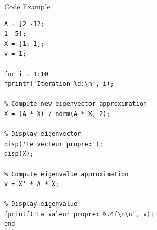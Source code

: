 \documentclass[french, 10pt]{beamer}
\theoremstyle{definition}
\begin{document}
\begin{frame}[fragile]{Code Example}
		\begin{lstlisting}
A = [2 -12;
1 -5];
X = [1; 1];
v = 1;

for i = 1:10
fprintf('Iteration %d:\n', i);

% Compute new eigenvector approximation
X = (A * X) / norm(A * X, 2);

% Display eigenvector
disp('Le vecteur propre:');
disp(X);

% Compute eigenvalue approximation
v = X' * A * X;

% Display eigenvalue
fprintf('La valeur propre: %.4f\n\n', v);
end

	
\end{lstlisting}
	
\end{frame}
\end{document}
